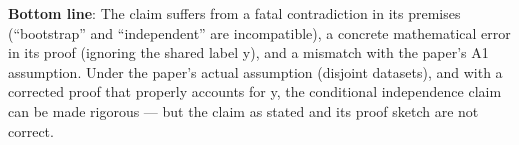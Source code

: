 \documentclass[
  12pt,
]{ctexart}
\begin{document}
\textbf{Bottom line}: The claim suffers from a fatal contradiction in
its premises (``bootstrap'' and ``independent'' are incompatible), a
concrete mathematical error in its proof (ignoring the shared label y),
and a mismatch with the paper's A1 assumption. Under the paper's actual
assumption (disjoint datasets), and with a corrected proof that properly
accounts for y, the conditional independence claim can be made rigorous
--- but the claim as stated and its proof sketch are not correct.
\end{document}

